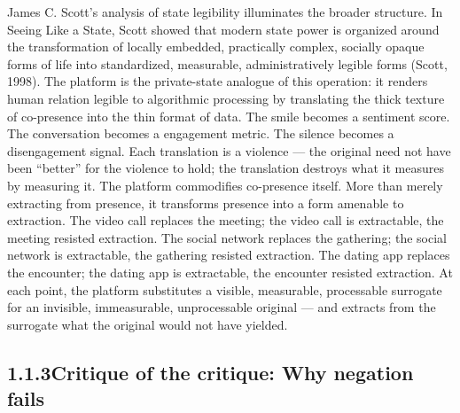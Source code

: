 James C. Scott’s analysis of state legibility illuminates the broader structure. In Seeing Like a State, Scott showed that modern state power is organized around the transformation of locally embedded, practically complex, socially opaque forms of life into standardized, measurable, administratively legible forms (Scott, 1998). The platform is the private-state analogue of this operation: it renders human relation legible to algorithmic processing by translating the thick texture of co-presence into the thin format of data. The smile becomes a sentiment score. The conversation becomes a engagement metric. The silence becomes a disengagement signal. Each translation is a violence — the original need not have been “better” for the violence to hold; the translation destroys what it measures by measuring it. The platform commodifies co-presence itself. More than merely extracting from presence, it transforms presence into a form amenable to extraction. The video call replaces the meeting; the video call is extractable, the meeting resisted extraction. The social network replaces the gathering; the social network is extractable, the gathering resisted extraction. The dating app replaces the encounter; the dating app is extractable, the encounter resisted extraction. At each point, the platform substitutes a visible, measurable, processable surrogate for an invisible, immeasurable, unprocessable original — and extracts from the surrogate what the original would not have yielded.

\subsection{1.1.3\quad Critique of the critique: Why negation fails}

